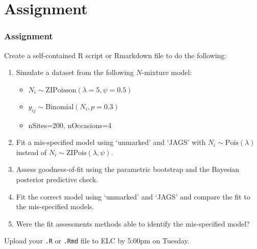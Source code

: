 \documentclass[color=usenames,dvipsnames]{beamer}\usepackage[]{graphicx}\usepackage[]{xcolor}
\begin{document}
\section{Assignment}




\begin{frame}[fragile]
  \frametitle{Assignment}
  \footnotesize
  Create a self-contained R script or Rmarkdown file
  to do the following:
  \vfill
  \begin{enumerate}
    \footnotesize
    \item Simulate a dataset from the following $N$-mixture model:
      \begin{itemize}
        \footnotesize
        \item $N_i \sim \mathrm{ZIPoisson}(\lambda=5, \psi=0.5)$
        \item $y_{ij} \sim \mathrm{Binomial}(N_i, p=0.3)$
        \item nSites=200, nOccasions=4
      \end{itemize}
    \item Fit a \alert{mis-specified model} using `unmarked' and `JAGS' with
      $N_i \sim \mathrm{Pois}(\lambda)$ instead of
      $N_i \sim \mathrm{ZIPois}(\lambda, \psi)$.
    \item Assess goodness-of-fit using the parametric bootstrap and
      the Bayesian posterior predictive check.
    \item Fit the \alert{correct model} using `unmarked' and `JAGS'
      and compare the fit to the mis-specified models.
    \item Were the fit assessments methods able to identify the
      mis-specified model?
  \end{enumerate}
  \vfill
  Upload your {\tt .R} or {\tt .Rmd} file to ELC by 5:00pm on Tuesday. 
\end{frame}
\end{document}
